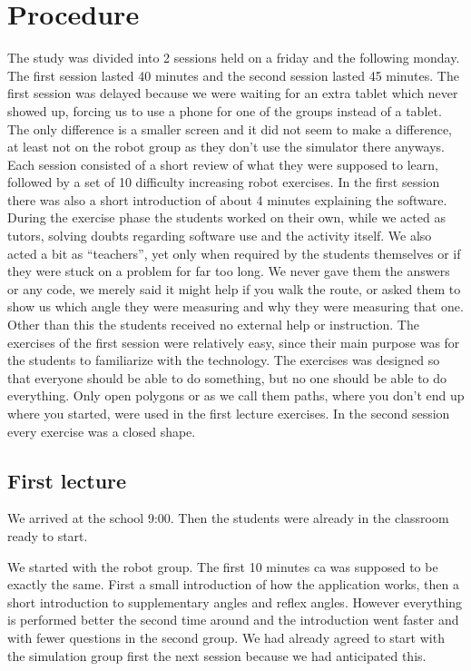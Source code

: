 \chapter{Procedure}
The study was divided into 2 sessions held on a friday and the following monday. The first session lasted 40 minutes and the second session lasted 45 minutes. The first session was delayed because we were waiting for an extra tablet which never showed up, forcing us to use a phone for one of the groups instead of a tablet. The only difference is a smaller screen and it did not seem to make a difference, at least not on the robot group as they don’t use the simulator there anyways. Each session consisted of a short review of what they were supposed to learn, followed by a set of 10 difficulty increasing robot exercises. In the first session there was also a short introduction of about 4 minutes explaining the software. During the exercise phase the students worked on their own, while we acted as tutors, solving doubts regarding software use and the activity itself. We also acted a bit as “teachers”, yet only when required by the students themselves or if they were stuck on a problem for far too long. We never gave them the answers or any code, we merely said it might help if you walk the route, or asked them to show us which angle they were measuring and why they were measuring that one. Other than this the students received no external help or instruction. The exercises of the first session were relatively easy, since their main purpose was for the students to familiarize with the technology. The exercises was designed so that everyone should be able to do something, but no one should be able to do everything. Only open polygons or as we call them paths, where you don’t end up where you started, were used in the first lecture exercises. In the second session every exercise was a closed shape. 


\section{First lecture}
We arrived at the school 9:00. Then the students were already in the classroom ready to start. 

\bigskip\noindent
We started with the robot group. The first 10 minutes ca was supposed to be exactly the same. First a small introduction of how the application works, then a short introduction to supplementary angles and reflex angles. However everything is performed better the second time around and the introduction went faster and with fewer questions in the second group. We had already agreed to start with the simulation group first the next session because we had anticipated this.

